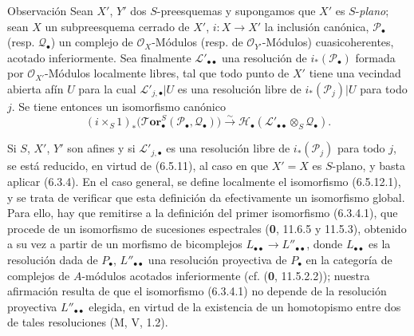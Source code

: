 \begin{namedtheorem}[6.5.12]{Observación}
Sean $X'$, $Y'$ dos $S$-preesquemas y supongamos que $X'$ es $S$-\emph{plano};
sean $X$ un subpreesquema cerrado de $X'$, $i:X\to X'$ la inclusión canónica,
$\mathscr P_\bullet$ (resp. $\mathscr Q_\bullet$) un complejo de
$\mathscr O_X$-Módulos (resp. de $\mathscr O_{Y'}$-Módulos) cuasicoherentes,
acotado inferiormente. Sea finalmente $\mathscr L'_{\bullet\bullet}$ una resolución
de $i_*(\mathscr P_\bullet)$ formada por $\mathscr O_{X'}$-Módulos localmente
libres, tal que todo punto de $X'$ tiene una vecindad abierta afín $U$ para
la cual $\mathscr L'_{j,\bullet}|U$ es una resolución libre de
$i_*(\mathscr P_j)|U$ para todo $j$. Se tiene entonces un isomorfismo canónico
\[
  (i\times_S 1)_*
  \bigl(\boldsymbol{\mathscr{T}\!or}_\bullet^S
    (\mathscr P_\bullet,\mathscr Q_\bullet)\bigr)
  \xrightarrow{\sim}
  \mathscr H_\bullet
  (\mathscr L'_{\bullet\bullet}\otimes_S\mathscr Q_\bullet).
  \tag{6.5.12.1}\label{III.6.5.12.1.fr}
\]

Si $S$, $X'$, $Y'$ son afines y si $\mathscr L'_{j,\bullet}$ es una
resolución libre de $i_*(\mathscr P_j)$ para todo $j$, se está reducido, en virtud
de (6.5.11), al caso en que $X'=X$ es $S$-plano, y basta aplicar (6.3.4).
En el caso general, se define localmente el isomorfismo (6.5.12.1), y se
trata de verificar que esta definición da efectivamente un isomorfismo global.
Para ello, hay que remitirse a la definición del primer isomorfismo
(6.3.4.1), que procede de un isomorfismo de sucesiones espectrales (\textbf{0}, 11.6.5 y
11.5.3), obtenido a su vez a partir de un morfismo de bicomplejos
$L_{\bullet\bullet}\to L''_{\bullet\bullet}$, donde $L_{\bullet\bullet}$ es la
resolución dada de $P_\bullet$, $L''_{\bullet\bullet}$ una resolución
proyectiva de $P_\bullet$ en la categoría de complejos de $A$-módulos
acotados
inferiormente (cf. (\textbf{0}, 11.5.2.2)); nuestra afirmación resulta de que
el isomorfismo (6.3.4.1) no depende de la resolución proyectiva
$L''_{\bullet\bullet}$ elegida, en virtud de la existencia de un homotopismo entre
dos de tales resoluciones (M, V, 1.2).
\end{namedtheorem}

